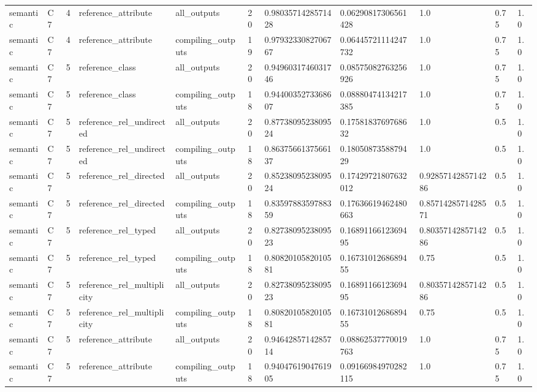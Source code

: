 \begin{tabular}{lllllllllll}
semantic & C7 & 4 & reference\_attribute & all\_outputs & 20 & 0.9803571428571428 & 0.06290817306561428 & 1.0 & 0.75 & 1.0 \\
semantic & C7 & 4 & reference\_attribute & compiling\_outputs & 19 & 0.9793233082706767 & 0.06445721114247732 & 1.0 & 0.75 & 1.0 \\
semantic & C7 & 5 & reference\_class & all\_outputs & 20 & 0.9496031746031746 & 0.08575082763256926 & 1.0 & 0.75 & 1.0 \\
semantic & C7 & 5 & reference\_class & compiling\_outputs & 18 & 0.9440035273368607 & 0.08880474134217385 & 1.0 & 0.75 & 1.0 \\
semantic & C7 & 5 & reference\_rel\_undirected & all\_outputs & 20 & 0.8773809523809524 & 0.1758183769768632 & 1.0 & 0.5 & 1.0 \\
semantic & C7 & 5 & reference\_rel\_undirected & compiling\_outputs & 18 & 0.8637566137566137 & 0.1805087358879429 & 1.0 & 0.5 & 1.0 \\
semantic & C7 & 5 & reference\_rel\_directed & all\_outputs & 20 & 0.8523809523809524 & 0.17429721807632012 & 0.9285714285714286 & 0.5 & 1.0 \\
semantic & C7 & 5 & reference\_rel\_directed & compiling\_outputs & 18 & 0.8359788359788359 & 0.17636619462480663 & 0.8571428571428571 & 0.5 & 1.0 \\
semantic & C7 & 5 & reference\_rel\_typed & all\_outputs & 20 & 0.8273809523809523 & 0.1689116612369495 & 0.8035714285714286 & 0.5 & 1.0 \\
semantic & C7 & 5 & reference\_rel\_typed & compiling\_outputs & 18 & 0.8082010582010581 & 0.1673101268689455 & 0.75 & 0.5 & 1.0 \\
semantic & C7 & 5 & reference\_rel\_multiplicity & all\_outputs & 20 & 0.8273809523809523 & 0.1689116612369495 & 0.8035714285714286 & 0.5 & 1.0 \\
semantic & C7 & 5 & reference\_rel\_multiplicity & compiling\_outputs & 18 & 0.8082010582010581 & 0.1673101268689455 & 0.75 & 0.5 & 1.0 \\
semantic & C7 & 5 & reference\_attribute & all\_outputs & 20 & 0.9464285714285714 & 0.08862537770019763 & 1.0 & 0.75 & 1.0 \\
semantic & C7 & 5 & reference\_attribute & compiling\_outputs & 18 & 0.9404761904761905 & 0.09166984970282115 & 1.0 & 0.75 & 1.0 \\
\end{tabular}